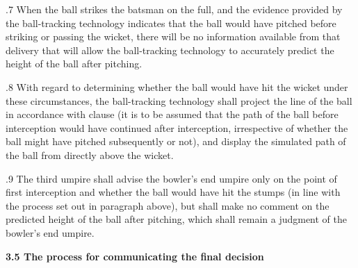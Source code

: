 \documentclass[12pt]{article}
\begin{document}
\vspace{\baselineskip}
\begin{adjustwidth}{0.5in}{0.18in}
{\fontsize{9pt}{10.8pt}.7 \tabto{0.49in} When the ball strikes the batsman on the full, and the evidence provided by the ball-tracking technology indicates that the ball would have pitched before striking or passing the wicket, there will be no information available from that delivery that will allow the ball-tracking technology to accurately predict the height of the ball after pitching.\par}\par

\end{adjustwidth}


\vspace{\baselineskip}
\begin{adjustwidth}{0.5in}{0.21in}
{\fontsize{9pt}{10.8pt}.8 \tabto{0.49in} With regard to determining whether the ball would have hit the wicket under these circumstances, the ball-tracking technology shall project the line of the ball in accordance with clause (it is to be assumed that the path of the ball before interception would have continued after interception, irrespective of whether the ball might have pitched subsequently or not), and display the simulated path of the ball from directly above the wicket.\par}\par

\end{adjustwidth}


\vspace{\baselineskip}
\begin{adjustwidth}{0.5in}{0.11in}
{\fontsize{9pt}{10.8pt}.9 \tabto{0.49in} The third umpire shall advise the bowler’s end umpire only on the point of first interception and whether the ball would have hit the stumps (in line with the process set out in paragraph above), but shall make no comment on the predicted height of the ball after pitching, which shall remain a judgment of the bowler’s end umpire.\par}\par

\end{adjustwidth}


\vspace{\baselineskip}
{\fontsize{11pt}{13.2pt}\selectfont \textbf{3.5 \tabto{0.47in} The process for communicating the final decision}\par}\par
\end{document}
